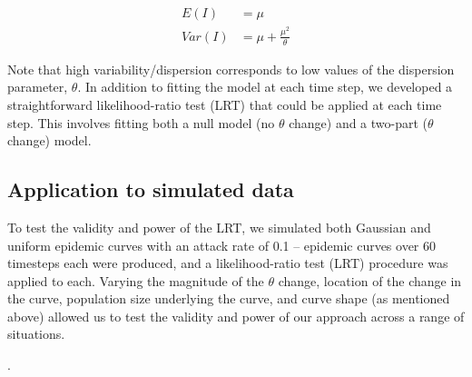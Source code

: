 \documentclass[10pt,letterpaper]{article}
\begin{document}
\begin{align}
  E(I) &= \mu\\
  Var(I) &= \mu + \frac{\mu^2}{\theta}
\end{align}

\noindent Note that high variability/dispersion corresponds to low values of the dispersion parameter, \begin{math}\theta\end{math}.
\noindent In addition to fitting the model at each time step, we developed a straightforward likelihood-ratio test (LRT) that could be applied at each time step. This involves fitting both a null model (no \begin{math}\theta\end{math} change) and a two-part (\begin{math}\theta\end{math} change) model.

\subsection*{Application to simulated data}

To test the validity and power of the LRT, we simulated both Gaussian and uniform epidemic curves with an attack rate of 0.1 -- epidemic curves over 60 timesteps each were produced, and a likelihood-ratio test (LRT) procedure was applied to each. 
Varying the magnitude of the \begin{math}\theta\end{math} change, location of the change in the curve, population size underlying the curve, and curve shape (as mentioned above) allowed us to test the validity and power of our approach across a range of situations.

.
\end{document}
